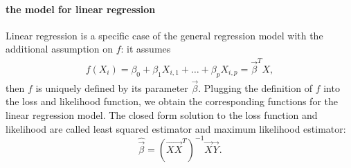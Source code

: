 \documentclass[runningheads,a4paper]{llncs}
\DeclareMathOperator*{\argmin}{arg\,min}
\newcommand{\E}[1]{\ensuremath{\mathbb{E}\left[#1\right]}}
\newcommand{\EE}[2]{\ensuremath{\mathbb{E}_{#1}\left[#2\right]}}
\newcommand{\ee}[1]{\ensuremath{\mathbb{E}#1}}
\begin{document}
\paragraph{the model for linear regression} %
\label{ssub:the_statistical_model}
Linear regression is a specific case of the general regression model with the additional assumption on $f$: it assumes 
\begin{align}
    f(X_i) = \beta_0 +\beta_1 X_{i,1} +\ldots + \beta_p X_{i,p} = \vec{\beta}^{T}{X},
\end{align} then $f$ is uniquely defined by its parameter $\vec{\beta}$.
Plugging the definition of $f$ into the loss and likelihood function, we obtain the corresponding functions for the linear regression model. The closed form solution to the loss function and likelihood are called least squared estimator and maximum likelihood estimator: \[\hat{\vec{\beta}}  = (\vec{XX}^{T})^{-1} \vec{X}\vec{Y}.\]








\end{document}
